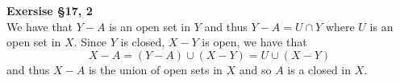 \documentclass[12pt]{article}
\newenvironment{ques}[1]{\textbf{Exersise #1}\vspace{1 mm}\\ }{\bigskip}
\theoremstyle{definition}
\begin{document}
\begin{ques}{\S 17, 2}
	We have that $Y - A$ is an open set in $Y$ and thus $Y - A = U \cap Y$
	where $U$ is an open set in $X$. Since $Y$ is closed, $X - Y$ is open, we have that
	$$X - A = (Y - A) \cup (X - Y) = U \cup (X - Y)$$
	and thus $X - A$ is the union of open sets in $X$ and so $A$ is a closed in
	$X$.
\end{ques}
\end{document}
